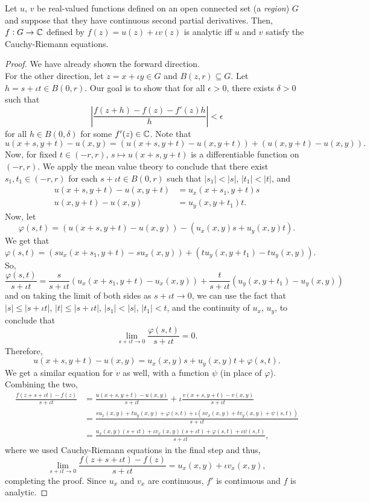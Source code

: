 	\begin{ftheo}
		Let $u$, $v$ be real-valued functions defined on an open connected set (a \emph{region}) $G$ and suppose that they have continuous second partial derivatives. Then, $f:G\to\mathbb{C}$ defined by $f(z) = u(z) + \iota v(z)$ is analytic iff $u$ and $v$ satisfy the Cauchy-Riemann equations.
	\end{ftheo}
	\begin{proof}
		We have already shown the forward direction.\\
		For the other direction, let $z = x + \iota y \in G$ and $B(z,r) \subseteq G$. Let $h = s + \iota t \in B(0,r)$. Our goal is to show that for all $\epsilon > 0$, there exists $\delta > 0$ such that
		\[ \left| \frac{f(z+h) - f(z) - f'(z)h}{h} \right| < \epsilon \]
		for all $h \in B(0,\delta)$ for some $f'(z) \in \mathbb{C}$.
		Note that
		\[ u(x+s,y+t) - u(x,y) = \left( u(x+s,y+t) - u(x,y+t) \right) + \left( u(x,y+t) - u(x,y) \right). \]
		Now, for fixed $t \in (-r,r)$, $s \mapsto u(x+s,y+t)$ is a differentiable function on $(-r,r)$. We apply the mean value theory to conclude that there exist $s_1,t_1 \in (-r,r)$ for each $s+\iota t \in B(0,r)$ such that $|s_1| < |s|$, $|t_1| < |t|$, and
		\begin{align*}
			u(x+s,y+t) - u(x,y+t) &= u_x(x+s_1,y+t)s \\
			u(x,y+t) - u(x,y) &= u_y(x,y+t_1)t.
		\end{align*}
		Now, let
		\[ \varphi(s,t) = \left( u(x+s,y+t) - u(x,y) \right) - \left( u_x(x,y)s + u_y(x,y)t \right). \]
		We get that
		\[ \varphi(s,t) = \left(s u_x(x+s_1,y+t) - s u_x(x,y)\right) + \left(t u_y(x,y+t_1) - t u_y(x,y)\right). \]
		So,
		\[ \frac{\varphi(s,t)}{s+\iota t} = \frac{s}{s+\iota t} \left(u_x(x+s_1,y+t) - u_x(x,y)\right) + \frac{t}{s+\iota t} \left(u_y(x,y+t_1) - u_y(x,y)\right) \]
		and on taking the limit of both sides as $s+\iota t \to 0$, we can use the fact that $|s| \le |s+\iota t|$, $|t| \le |s+\iota t|$, $|s_1| < |s|$, $|t_1| < t$, and the continuity of $u_x$, $u_y$, to conclude that
		\[ \lim_{s+\iota t \to 0} \frac{\varphi(s,t)}{s+\iota t} = 0. \]
		Therefore,
		\[ u(x+s,y+t) - u(x,y) = u_x(x,y)s + u_y(x,y) t + \varphi(s,t). \]
		We get a similar equation for $v$ as well, with a function $\psi$ (in place of $\varphi$). Combining the two,
		\begin{align*}
			\frac{f(z+s+\iota t) - f(z)}{s+\iota t} &= \frac{u(x+s,y+t)-u(x,y)}{s+\iota t} + \iota \frac{v(x+s,y+t) - v(x,y)}{s+\iota t} \\
				&= \frac{s u_x(x,y) + t u_y(x,y) + \varphi(s,t) + \iota \left( s v_x(x,y) + t v_y(x,y) + \psi(s,t) \right)}{s+\iota t} \\
				&= \frac{u_x(x,y) (s+\iota t) + \iota v_x(x,y) (s+\iota t) + \varphi(s,t) + \iota \psi(s,t)}{s+\iota t},
		\end{align*}
		where we used Cauchy-Riemann equations in the final step and thus,
		\[ \lim_{s+\iota t \to 0} \frac{f(z+s+\iota t) - f(z)}{s+\iota t} = u_x(x,y) + \iota v_x(x,y), \]
		completing the proof. Since $u_x$ and $v_x$ are continuous, $f'$ is continuous and $f$ is analytic.
	\end{proof}

